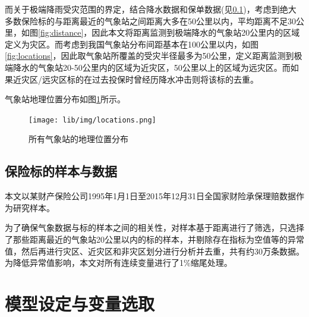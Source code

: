 而关于极端降雨受灾范围的界定，结合降水数据和保单数据(见\ref{sec:data})，考虑到绝大多数保险标的与距离最近的气象站之间距离大多在50公里以内，平均距离不足30公里，如图\ref{fig:distance}，因此本文将距离监测到极端降水的气象站20公里内的区域定义为灾区。而考虑到我国气象站分布间距基本在100公里以内，如图\ref{fig:locations}，因此取气象站所覆盖的受灾半径最多为50公里，定义距离监测到极端降水的气象站20-50公里内的区域为近灾区，50公里以上的区域为远灾区。而如果近灾区/远灾区标的在过去投保时曾经历降水冲击则将该标的去重。

气象站地理位置分布如图\ref{fig:location}所示。

\begin{figure}[H]
        \centering
        \texttt{[image: lib/img/locations.png]}
        \caption{所有气象站的地理位置分布}
        \label{fig:location}
\end{figure}
\subsection{保险标的样本与数据}\label{sec:data}
本文以某财产保险公司1995年1月1日至2015年12月31日全国家财险承保理赔数据作为研究样本。

为了确保气象数据与标的样本之间的相关性，对样本基于距离进行了筛选，只选择了那些距离最近的气象站20公里以内的标的样本，并剔除存在指标为空值等的异常值，然后再进行灾区、近灾区和非灾区划分进行分析并去重，共有约30万条数据。为降低异常值影响，本文对所有连续变量进行了1\%缩尾处理。

\section{模型设定与变量选取}
